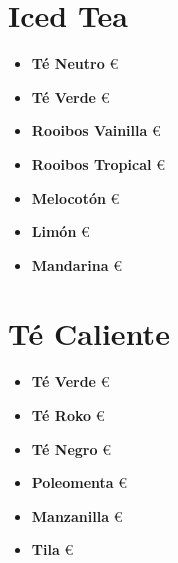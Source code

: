 \documentclass[a4paper,12pt]{article}
\begin{document}
\vfill \vfill \vfill \vfill
\begin{multicols}{2}
\section*{ Iced Tea}
\begin{itemize}
    \item \textbf{Té Neutro}  €
    \item \textbf{Té Verde}  €
    \item \textbf{Rooibos Vainilla}  €
    \item \textbf{Rooibos Tropical}  €
    \item \textbf{Melocotón}  €
    \item \textbf{Limón}  €
    \item \textbf{Mandarina}  €
\end{itemize}

\section*{ Té Caliente}
\begin{itemize}
    \item \textbf{Té Verde}  €
    \item \textbf{Té Roko}  €
    \item \textbf{Té Negro}  €
    \item \textbf{Poleomenta}  €
    \item \textbf{Manzanilla}  €
    \item \textbf{Tila}  €
\end{itemize}
\end{multicols} 
\end{document}
